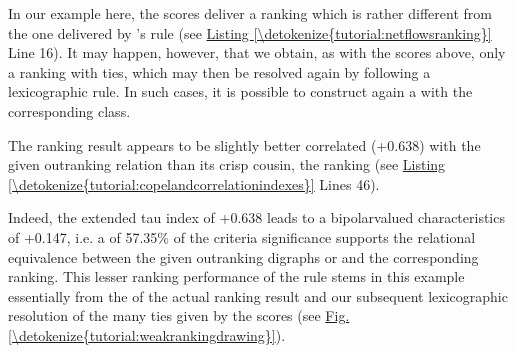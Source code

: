\documentclass[a4paper,12pt,english]{sphinxhowto}
\begin{document}
In our example here, the  scores deliver  a ranking  which is rather different from the one delivered by ’s rule (see \hyperref[\detokenize{tutorial:netflowsranking}]{Listing \ref{\detokenize{tutorial:netflowsranking}}} Line 16). It may happen, however, that we obtain, as with the  scores above, only a ranking with ties, which may then be resolved again by following a lexicographic rule. In such cases, it is possible to construct again a  with the corresponding  class.

The  ranking result appears to be slightly better correlated (+0.638) with the given outranking relation than its crisp cousin, the  ranking (see \hyperref[\detokenize{tutorial:copelandcorrelationindexes}]{Listing \ref{\detokenize{tutorial:copelandcorrelationindexes}}} Lines 4\sphinxhyphen{}6).
\def\sphinxLiteralBlockLabel{\label{\detokenize{tutorial:netflowscorrelationindexes}}}
\begin{sphinxVerbatim}[commandchars=\\\{\},numbers=left,firstnumber=1,stepnumber=1]
  
\end{sphinxVerbatim}

Indeed, the extended  tau index of +0.638 leads to a bipolar\sphinxhyphen{}valued  characteristics of +0.147, i.e. a  of 57.35\% of the criteria significance supports the relational equivalence between the given outranking digraphs  or   and the corresponding  ranking. This lesser ranking performance of the  rule stems in this example essentially from the  of the actual ranking result and our subsequent  lexicographic resolution of the many ties given by the  scores (see \hyperref[\detokenize{tutorial:weakrankingdrawing}]{Fig.\@ \ref{\detokenize{tutorial:weakrankingdrawing}}}).
\end{document}
